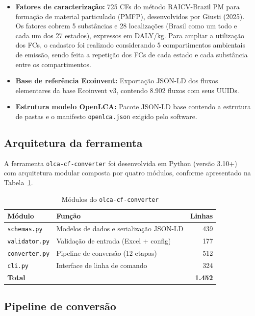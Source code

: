 \begin{itemize}
    \item \textbf{Fatores de caracteriza\c{c}\~ao:} 725 CFs do m\'etodo RAICV-Brazil PM para forma\c{c}\~ao de material particulado (PMFP), desenvolvidos por Giusti (2025). Os fatores cobrem 5 subst\^ancias e 28 localiza\c{c}\~oes (Brasil como um todo e cada um dos 27 estados), expressos em DALY/kg. Para ampliar a utilização dos FCs, o cadastro foi realizado considerando 5 compartimentos ambientais de emiss\~ao, sendo feita a repetição dos FCs de cada estado e cada substância entre os compartimentos.
    \item \textbf{Base de refer\^encia Ecoinvent:} Exporta\c{c}\~ao JSON-LD dos fluxos elementares da base Ecoinvent v3, contendo 8.902 fluxos com seus UUIDs.
    \item \textbf{Estrutura modelo OpenLCA:} Pacote JSON-LD base contendo a estrutura de pastas e o manifesto \texttt{openlca.json} exigido pelo software.
\end{itemize}

\subsection{Arquitetura da ferramenta}

A ferramenta \texttt{olca-cf-converter} foi desenvolvida em Python (vers\~ao 3.10+) com arquitetura modular composta por quatro m\'odulos, conforme apresentado na Tabela~\ref{tab:olca}.

\begin{table}[H]
\centering
\caption{M\'odulos do \texttt{olca-cf-converter}}
\label{tab:olca}
\begin{tabular}{llr}
\toprule
\textbf{M\'odulo} & \textbf{Fun\c{c}\~ao} & \textbf{Linhas} \\
\midrule
\texttt{schemas.py} & Modelos de dados e serializa\c{c}\~ao JSON-LD & 439 \\
\texttt{validator.py} & Valida\c{c}\~ao de entrada (Excel + config) & 177 \\
\texttt{converter.py} & Pipeline de convers\~ao (12 etapas) & 512 \\
\texttt{cli.py} & Interface de linha de comando & 324 \\
\midrule
\textbf{Total} & & \textbf{1.452} \\
\bottomrule
\end{tabular}
\end{table}

\subsection{Pipeline de convers\~ao}

